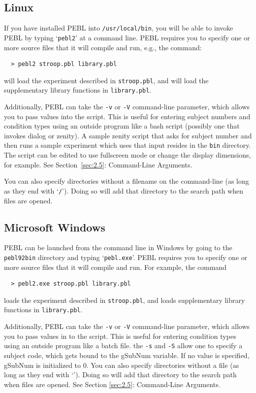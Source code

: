 \subsection{Linux}

If you have installed PEBL into \texttt{/usr/local/bin}, you will be able to
invoke PEBL by typing `\texttt{pebl2}' at a command line.  PEBL requires you to
specify one or more source files that it will compile and run, e.g., the
command:
\begin{verbatim}
  > pebl2 stroop.pbl library.pbl
\end{verbatim}
will load the experiment described in \texttt{stroop.pbl}, and will load the
supplementary library functions in \texttt{library.pbl}.

Additionally, PEBL can take the \texttt{-v} or \texttt{-V} command-line parameter, which allows you to pass values into the script.  This is useful for
entering subject numbers and condition types using an outside program
like a bash script (possibly one that invokes dialog or zenity). A sample zenity script that asks for subject number and then runs a sample experiment which uses that input resides in the \texttt{bin} directory. The script can be edited to use fullscreen mode or change the display dimensions, for example. See Section~\ref{sec:2.5}: Command-Line Arguments.

You can also specify directories without a filename on the command-line (as long as they end with `\texttt{/}').  Doing so will add that directory to the search path when files are opened.

\subsection{ Microsoft Windows}

PEBL can be launched from the command line in Windows by going to the
\texttt{pebl\char92bin} directory and typing `\texttt{pebl.exe}'.
PEBL requires you to specify one or more source files that it will
compile and run.  For example, the command
\begin{verbatim}
  > pebl2.exe stroop.pbl library.pbl
\end{verbatim}
loads the experiment described in \texttt{stroop.pbl}, and loads supplementary library functions in \texttt{library.pbl}.

Additionally, PEBL can take the \texttt{-v} or \texttt{-V}
command-line parameter, which allows you to pass values in to the
script.  This is useful for entering condition types using an outside
program like a batch file. the \texttt{-s} and \texttt{-S} allow one
to specify a subject code, which gets bound to the gSubNum variable.
If no value is specified, gSubNum is initialized to 0.  You can also
specify directories without a file (as long as they end with
`\texttt{}').  Doing so will add that directory to the search
path when files are opened. See Section \ref{sec:2.5}: Command-Line
Arguments.

